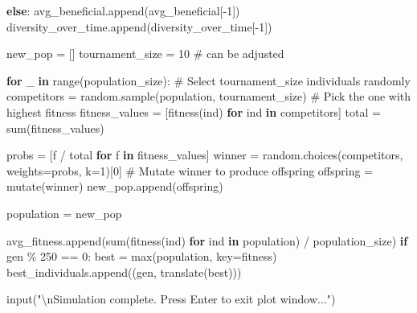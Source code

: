 \documentclass[
  letterpaper,
  DIV=11,
  numbers=noendperiod]{scrreprt}
\newenvironment{Shaded}{\begin{snugshade}}{\end{snugshade}}
\newcommand{\BuiltInTok}[1]{\textcolor[rgb]{0.00,0.23,0.31}{#1}}
\newcommand{\CharTok}[1]{\textcolor[rgb]{0.13,0.47,0.30}{#1}}
\newcommand{\CommentTok}[1]{\textcolor[rgb]{0.37,0.37,0.37}{#1}}
\newcommand{\ControlFlowTok}[1]{\textcolor[rgb]{0.00,0.23,0.31}{\textbf{#1}}}
\newcommand{\DecValTok}[1]{\textcolor[rgb]{0.68,0.00,0.00}{#1}}
\newcommand{\KeywordTok}[1]{\textcolor[rgb]{0.00,0.23,0.31}{\textbf{#1}}}
\newcommand{\NormalTok}[1]{\textcolor[rgb]{0.00,0.23,0.31}{#1}}
\newcommand{\OperatorTok}[1]{\textcolor[rgb]{0.37,0.37,0.37}{#1}}
\newcommand{\StringTok}[1]{\textcolor[rgb]{0.13,0.47,0.30}{#1}}
\theoremstyle{definition}
\theoremstyle{remark}
\begin{document}
\begin{tcolorbox}
\begin{Shaded}
\begin{Highlighting}[]
    \ControlFlowTok{else}\NormalTok{:}
\NormalTok{        avg\_beneficial.append(avg\_beneficial[}\OperatorTok{{-}}\DecValTok{1}\NormalTok{])}
\NormalTok{        diversity\_over\_time.append(diversity\_over\_time[}\OperatorTok{{-}}\DecValTok{1}\NormalTok{])}

\NormalTok{    new\_pop }\OperatorTok{=}\NormalTok{ []}
\NormalTok{    tournament\_size }\OperatorTok{=} \DecValTok{10}  \CommentTok{\# can be adjusted}
    
    \ControlFlowTok{for}\NormalTok{ \_ }\KeywordTok{in} \BuiltInTok{range}\NormalTok{(population\_size):}
        \CommentTok{\# Select tournament\_size individuals randomly}
\NormalTok{        competitors }\OperatorTok{=}\NormalTok{ random.sample(population, tournament\_size)}
        \CommentTok{\# Pick the one with highest fitness}
\NormalTok{        fitness\_values }\OperatorTok{=}\NormalTok{ [fitness(ind) }\ControlFlowTok{for}\NormalTok{ ind }\KeywordTok{in}\NormalTok{ competitors]}
\NormalTok{        total }\OperatorTok{=} \BuiltInTok{sum}\NormalTok{(fitness\_values)}
        
\NormalTok{        probs }\OperatorTok{=}\NormalTok{ [f }\OperatorTok{/}\NormalTok{ total }\ControlFlowTok{for}\NormalTok{ f }\KeywordTok{in}\NormalTok{ fitness\_values]}
\NormalTok{        winner }\OperatorTok{=}\NormalTok{ random.choices(competitors, weights}\OperatorTok{=}\NormalTok{probs, k}\OperatorTok{=}\DecValTok{1}\NormalTok{)[}\DecValTok{0}\NormalTok{]}
        \CommentTok{\# Mutate winner to produce offspring}
\NormalTok{        offspring }\OperatorTok{=}\NormalTok{ mutate(winner)}
\NormalTok{        new\_pop.append(offspring)}

\NormalTok{    population }\OperatorTok{=}\NormalTok{ new\_pop}


\NormalTok{    avg\_fitness.append(}\BuiltInTok{sum}\NormalTok{(fitness(ind) }\ControlFlowTok{for}\NormalTok{ ind }\KeywordTok{in}\NormalTok{ population) }\OperatorTok{/}\NormalTok{ population\_size)}
    \ControlFlowTok{if}\NormalTok{ gen }\OperatorTok{\%} \DecValTok{250} \OperatorTok{==} \DecValTok{0}\NormalTok{:}
\NormalTok{        best }\OperatorTok{=} \BuiltInTok{max}\NormalTok{(population, key}\OperatorTok{=}\NormalTok{fitness)}
\NormalTok{        best\_individuals.append((gen, translate(best)))}

\BuiltInTok{input}\NormalTok{(}\StringTok{"}\CharTok{\textbackslash{}n}\StringTok{Simulation complete. Press Enter to exit plot window..."}\NormalTok{)}
\end{Highlighting}
\end{Shaded}

\end{tcolorbox}
\end{document}
